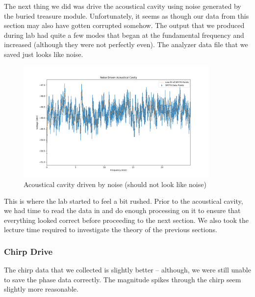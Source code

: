 \documentclass{article}
\begin{document}
The next thing we did was drive the acoustical cavity using noise generated by
the buried treasure module. Unfortunately, it seems as though our data from
this section may also have gotten corrupted somehow. The output that we
produced during lab had quite a few modes that began at the fundamental
frequency and increased (although they were not perfectly even). The analyzer
data file that we saved just looks like noise. 

\begin{figure}[H]
    \centering
\begin{minipage}{11cm}
\begin{tcolorbox}
    \centering
        \includegraphics[width=10cm, height=6cm]{figures/figure31.png}
        \caption{Acoustical cavity driven by noise (should not look like noise)}
        \label{fig:fig31}
\end{tcolorbox}
\end{minipage}
\end{figure}

This is where the lab started to feel a bit rushed. Prior to the acoustical
cavity, we had time to read the data in and do enough processing on it to
ensure that everything looked correct before proceeding to the next section. We
also took the lecture time required to investigate the theory of the previous
sections. 

\subsubsection{Chirp Drive}%
\label{ssub:chirp_drive}

The chirp data that we collected is slightly better -- although, we were still
unable to save the phase data correctly. The magnitude spikes through the chirp
seem slightly more reasonable.
\end{document}
